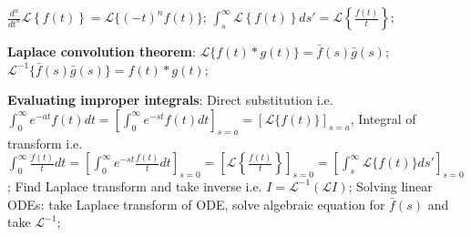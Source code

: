 \documentclass[10pt,landscape]{article}
\begin{document}
\begin{multicols}{3}
$\frac{d^n}{d t^n} \mathcal{L} \left\{ f(t) \right\} = \mathcal{L} \{ (-t)^n f(t) \}$;
$\int_s^\infty \mathcal{L} \left\{ f(t) \right\} ds' 
	= \mathcal{L} \left\{ \frac{f(t)}{t} \right\}$;

\textbf{Laplace convolution theorem}: $\mathcal{L} \{ f(t) \ast g(t) \} 
	= \bar{f}(s) \bar{g}(s)$;
$\mathcal{L}^{-1} \{ \bar{f}(s) \bar{g}(s) \} = f(t) \ast g(t)$;

\textbf{Evaluating improper integrals}: Direct substitution i.e. $\int_0^\infty
	e^{-at} f(t) dt = \left[ \int_0^\infty e^{-st} f(t) dt \right]_{s=a}
	= [ \mathcal{L} \{ f(t) \} ]_{s=a}$,
	Integral of transform i.e.
	$\int_0^\infty \frac{f(t)}{t} dt = \left[ \int_0^\infty e^{-st} 
	\frac{f(t)}{t} dt \right]_{s=0} = \left[ \mathcal{L} \left\{ 
	\frac{f(t)}{t} \right\} \right]_{s=0} = \left[ \int_s^\infty 
	\mathcal{L} \{ f(t) \} ds' \right]_{s=0}$;
	Find Laplace transform and take inverse i.e. $I = \mathcal{L}^{-1} 
	(\mathcal{L} I )$;
Solving linear ODEs: take Laplace transform of ODE, solve algebraic equation
	for $\bar{f}(s)$ and take $\mathcal{L}^{-1}$;
%
%

\end{multicols}
\end{document}
